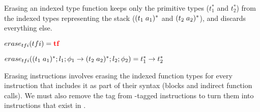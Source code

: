 Erasing an indexed type function keeps only the primitive \wasm types ($t_1^{*}$ and $t_2^{*}$) from the indexed types representing the stack ($\ti{t_1}{a_1}^{*}$ and $\ti{t_2}{a_2}^{*}$), and discards everything else.

\begin{definition}{$\erase[tfi]{tfi} = \mathredbold{tf}$}

    $\erase[tfi]{\ti{t_1}{a_1}^{*};l_1;\phi_1 \rightarrow \ti{t_2}{a_2}^{*};l_2;\phi_2} = t_1^{*} \rightarrow t_2^{*}$
\end{definition}

Erasing instructions involves erasing the indexed function types for every instruction that includes it as part of their syntax (blocks and indirect function calls).
We must also remove the \prechk tag from \prechk-tagged instructions to turn them into instructions that exist in \wasm.

